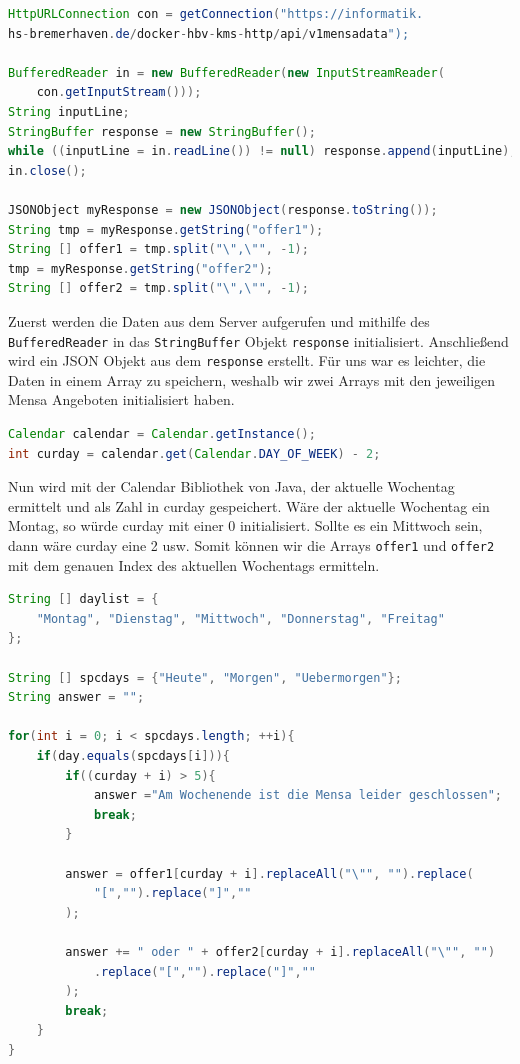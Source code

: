 \begin{lstlisting}[language=Java, caption={Auslesen der Mensa-API}]
HttpURLConnection con = getConnection("https://informatik.
hs-bremerhaven.de/docker-hbv-kms-http/api/v1mensadata");

BufferedReader in = new BufferedReader(new InputStreamReader(
    con.getInputStream()));
String inputLine;
StringBuffer response = new StringBuffer();
while ((inputLine = in.readLine()) != null) response.append(inputLine); 
in.close();

JSONObject myResponse = new JSONObject(response.toString());
String tmp = myResponse.getString("offer1");
String [] offer1 = tmp.split("\",\"", -1);
tmp = myResponse.getString("offer2");
String [] offer2 = tmp.split("\",\"", -1); 
\end{lstlisting}

Zuerst werden die Daten aus dem Server aufgerufen und mithilfe des \verb|BufferedReader| in das \verb|StringBuffer| Objekt \verb|response| initialisiert. Anschließend wird ein JSON Objekt aus dem \verb|response| erstellt. Für uns war es leichter, die Daten in einem Array zu speichern, weshalb wir zwei Arrays mit den jeweiligen Mensa Angeboten initialisiert haben.\\

\begin{lstlisting}[language=Java, caption={Kalenderfunktion in Java}]
Calendar calendar = Calendar.getInstance();
int curday = calendar.get(Calendar.DAY_OF_WEEK) - 2;    
\end{lstlisting}

Nun wird mit der Calendar Bibliothek von Java, der aktuelle Wochentag ermittelt und als Zahl in curday gespeichert. Wäre der aktuelle Wochentag ein Montag, so würde curday mit einer 0 initialisiert. Sollte es ein Mittwoch sein, dann wäre curday eine 2 usw. Somit können wir die Arrays \verb|offer1| und \verb|offer2| mit dem genauen Index des aktuellen Wochentags ermitteln.\\

\begin{lstlisting}[language=Java, caption={Ermittlung der Mensadaten für heute, morgen und übermorgen}]
String [] daylist = {
    "Montag", "Dienstag", "Mittwoch", "Donnerstag", "Freitag"
};

String [] spcdays = {"Heute", "Morgen", "Uebermorgen"};
String answer = "";

for(int i = 0; i < spcdays.length; ++i){
    if(day.equals(spcdays[i])){
        if((curday + i) > 5){
            answer ="Am Wochenende ist die Mensa leider geschlossen";
            break;
        }
        
        answer = offer1[curday + i].replaceAll("\"", "").replace(
            "[","").replace("]",""
        );

        answer += " oder " + offer2[curday + i].replaceAll("\"", "")
            .replace("[","").replace("]",""
        );
        break;
    }
}    
\end{lstlisting}

